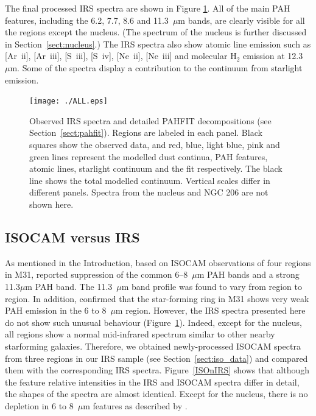
The final processed IRS spectra are shown in  Figure \ref{PAHFITplots}. All of the main PAH features, including the 6.2, 7.7, 8.6 and 11.3~$\mu$m bands, 
are clearly visible for all the regions except the nucleus. (The spectrum of the nucleus is further discussed in Section~\ref{sect:nucleus}.)
The IRS spectra also show atomic line emission such as [Ar~{\sc ii}], [Ar~{\sc iii}], [S~{\sc iii}], [S~{\sc iv}], [Ne~{\sc ii}], [Ne~{\sc iii}] 
and molecular H$_{2}$ emission at 12.3~$\mu$m. Some of the spectra display a contribution to the continuum from starlight emission.


\begin{figure}
\centering
\texttt{[image: ./ALL.eps]}
 \caption{Observed IRS spectra and detailed PAHFIT decompositions (see Section~\ref{sect:pahfit}). Regions are labeled in each panel.
Black squares show the observed data, and red, blue, light blue, pink and green lines represent the modelled
dust continua, PAH features, atomic lines, starlight continuum and the fit respectively. The black line shows the total modelled continuum. 
Vertical scales differ in different panels. Spectra from the nucleus and NGC 206 are not shown here.
}
\label{PAHFITplots}
\end{figure}


\subsection{ISOCAM versus IRS}
\label{sect:iso_vs_irs}

As mentioned in the Introduction, based on ISOCAM observations of four regions in M31, \citet{1998Cesarsky} reported 
suppression of the common 6--8~$\mu$m PAH bands and a strong 11.3$\mu$m PAH band.
The 11.3~$\mu$m band profile was found to vary from region to region.  
In addition, \citet{Pagani_1999} confirmed that the star-forming ring in M31 shows very weak PAH emission in the 6 to 8~$\mu$m region. 
However, the IRS spectra presented here do not show such unusual behaviour (Figure~\ref{PAHFITplots}). 
Indeed, except for the nucleus, all regions show a normal mid-infrared spectrum similar to other nearby starforming galaxies. 
Therefore, we obtained newly-processed ISOCAM spectra from three regions in our IRS sample (see Section~\ref{sect:iso_data}) 
and compared them with the corresponding IRS spectra.
Figure~\ref{ISOnIRS} shows that although the feature relative intensities  in the IRS and ISOCAM 
spectra differ in detail, the shapes of the spectra are almost identical. Except for the nucleus, there is no depletion in 
6 to 8~$\mu$m features as described by \citet{1998Cesarsky}. 



